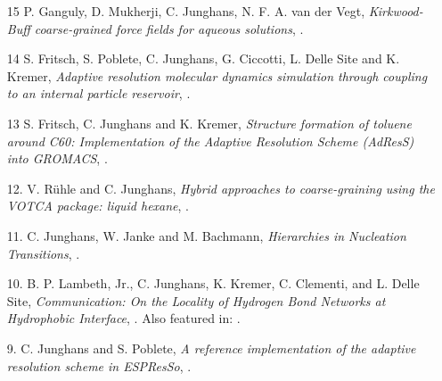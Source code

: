 \documentclass{article}
\begin{document}
\begin{enumerate}
\item[15] P. Ganguly, D. Mukherji, C. Junghans, N. F. A. van der Vegt,
  \textit{Kirkwood-Buff coarse-grained force fields for aqueous solutions},
  .

\item[14] S. Fritsch, S. Poblete, C. Junghans, G. Ciccotti, L. Delle Site and K. Kremer,
  \textit{Adaptive resolution molecular dynamics simulation through coupling to an internal particle reservoir},
  .

\item[13] S. Fritsch, C. Junghans and K. Kremer,
  \textit{Structure formation of toluene around C60: Implementation of the Adaptive Resolution Scheme (AdResS) into GROMACS},
  .

\item[12.] V. R{\"u}hle and C. Junghans,
  \textit{Hybrid approaches to coarse-graining using the VOTCA package: liquid hexane},
  .

\item[11.] C. Junghans, W. Janke and M. Bachmann,
  \textit{Hierarchies in Nucleation Transitions},
  .

\item[10.] B. P. Lambeth, Jr., C. Junghans, K. Kremer, C. Clementi, and L. Delle Site, 
  \textit{Communication: On the Locality of Hydrogen Bond Networks at Hydrophobic Interface},
  .
  Also featured in: .

\item[9.] C. Junghans and S. Poblete,
  \textit{A reference implementation of the adaptive resolution scheme in ESPResSo},
  .


\end{enumerate}
\end{document}
